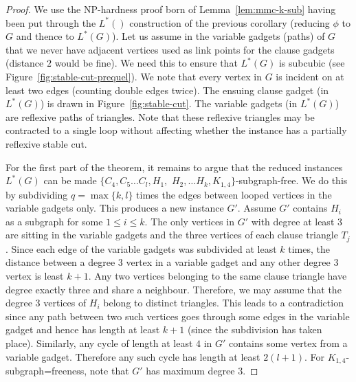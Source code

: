 \documentclass[a4paper,UKenglish,cleveref, autoref,thm-restate]{lipics-v2021}
\begin{document}
\begin{proof}
We use the NP-hardness proof born of Lemma~\ref{lem:mmc-k-sub} having been put through the $L^*()$ construction of the previous corollary (reducing $\phi$ to $G$ and thence to $L^*(G)$). Let us assume in the variable gadgets (paths) of $G$ that we never have adjacent vertices used as link points for the clause gadgets (distance $2$ would be fine). We need this to ensure that $L^*(G)$ is subcubic (see Figure~\ref{fig:stable-cut-prequel}). We note that every vertex in $G$ is incident on at least two edges (counting double edges twice). The ensuing clause gadget (in $L^*(G)$) is drawn in Figure~\ref{fig:stable-cut}. The variable gadgets (in $L^*(G)$) are reflexive paths of triangles. Note that these reflexive triangles may be contracted to a single loop without affecting whether the instance has a partially reflexive stable cut.

For the first part of the theorem, it remains to argue that the reduced instances $L^*(G)$ can be made $\{C_4, C_5 \ldots C_l,  H_1,$ $H_2, \dots H_k, K_{1,4}\}$-subgraph-free. We do this by subdividing $q=\max\{k,l\}$ times the edges between looped vertices in the variable gadgets only. This produces a new instance $G'$. Assume $G'$ contains $H_i$ as a subgraph for some $1 \leq i \leq k$. The only vertices in $G'$ with degree at least $3$ are sitting in the variable gadgets and the three vertices of each clause triangle $T_{j}$. Since each edge of the variable gadgets was subdivided at least $k$ times, the distance between a degree $3$ vertex in a variable gadget and any other degree $3$ vertex is least $k+1$. Any two vertices belonging to the same clause triangle have degree exactly three and share a neighbour. Therefore, we may assume that the degree $3$ vertices of $H_i$ belong to distinct triangles. This leads to a contradiction since any path between two such vertices goes through some edges in the variable gadget and hence has length at least $k+1$ (since the subdivision has taken place). Similarly, any cycle of length at least $4$ in $G'$ contains some vertex from a variable gadget. Therefore any such cycle has length at least $2(l+1)$. For $K_{1,4}$-subgraph=freeness, note that $G'$ has maximum degree $3$.


\end{proof}
\end{document}
